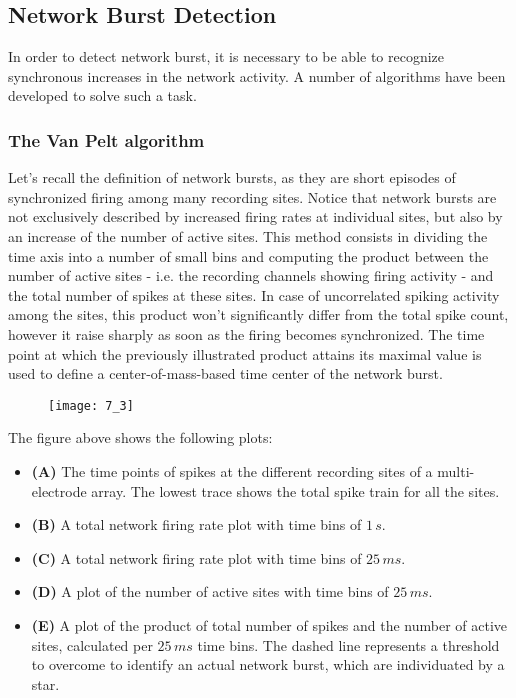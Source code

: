 \subsection{Network Burst Detection}
In order to detect network burst, it is necessary to be able to recognize synchronous
increases in the network activity. A number of algorithms have been developed to
solve such a task.
\subsubsection{The Van Pelt algorithm}
Let's recall the definition of network bursts, as they are short episodes of
synchronized firing among many recording sites. Notice that network bursts are not
exclusively described by increased firing rates at individual sites, but also by an
increase of the number of active sites. This method consists in dividing the time
axis into a number of small bins and computing the product between the number of
active sites - i.e. the recording channels showing firing activity - and the total
number of spikes at these sites. In case of uncorrelated spiking activity among
the sites, this product won't significantly differ from the total spike count, however
it raise sharply as soon as the firing becomes synchronized. The time point at
which the previously illustrated product attains its maximal value is used to
define a center-of-mass-based time center of the network burst.
\begin{figure}[H]
    \texttt{[image: 7\_3]}
    \centering
\end{figure}
The figure above shows the following plots:
\begin{itemize}
    \item \textbf{(A)} The time points of spikes at the different recording sites of
          a multi-electrode array. The lowest trace shows the total spike train for all
          the sites.
    \item \textbf{(B)} A total network firing rate plot with time bins of \(1\,s\).
    \item \textbf{(C)} A total network firing rate plot with time bins of \(25\,ms\).
    \item \textbf{(D)} A plot of the number of active sites with time bins
          of \(25\,ms\).
    \item \textbf{(E)} A plot of the product of total number of spikes and the
          number of active sites, calculated per \(25\,ms\) time bins. The dashed line
          represents a threshold to overcome to identify an actual network burst, which
          are individuated by a star.
\end{itemize}
